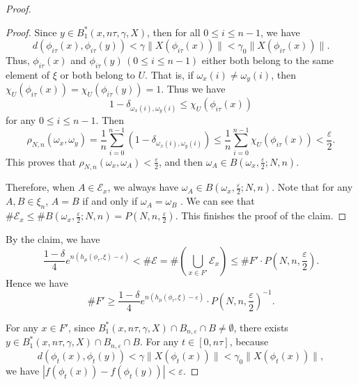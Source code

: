 \documentclass[10pt]{article}
\newtheorem*{Theorem A}{Theorem A}
\begin{document}
\begin{proof}
\begin{proof}
Since \( y \in B_1^*(x, n\tau, \gamma, X) \), then for all \( 0 \leq i \leq n - 1 \), we have
\[
d(\phi_{i\tau}(x), \phi_{i\tau}(y)) < \gamma \| X(\phi_{i\tau}(x)) \| < \gamma_0 \| X(\phi_{i\tau}(x)) \|.
\]
Thus, \( \phi_{i\tau}(x) \) and \( \phi_{i\tau}(y)\, (0\leq i\leq n-1)\) either both belong to the same element of \(\xi\) or both belong to \( U \). That is, if \( \omega_x(i) \neq \omega_y(i) \), then \( \chi_U(\phi_{i\tau}(x)) = \chi_U(\phi_{i\tau}(y)) = 1 \). Thus we have
\[
1 - \delta_{\omega_x(i), \omega_y(i)} \leq \chi_U(\phi_{i\tau}(x))
\]
for any $0\leq i\leq n-1$. Then
\[
\rho_{N,n}(\omega_x, \omega_y) = \frac{1}{n} \sum_{i = 0}^{n - 1} (1 - \delta_{\omega_x(i), \omega_y(i)}) \leq \frac{1}{n} \sum_{i = 0}^{n - 1} \chi_U(\phi_{i\tau}(x)) < \frac{\varepsilon}{2}.
\]
This proves that \( \rho_{N,n}(\omega_x, \omega_A) < \frac{\varepsilon}{2} \), and then \( \omega_A \in B\left( \omega_x, \frac{\varepsilon}{2}; N, n \right) \).

Therefore, when \(A\in \mathcal{E}_x \), we always have \( \omega_A \in B\left( \omega_x, \frac{\varepsilon}{2}; N, n \right) \). Note that for any $A, B\in \xi_n$, \( A=B \) if and only if \( \omega_A = \omega_B \) . We can see that \( \#\mathcal{E}_x \leq \# B\left( \omega_x, \frac{\varepsilon}{2}; N, n \right) = P\left( N, n, \frac{\varepsilon}{2} \right) \). This finishes the proof of the claim.
\end{proof}

By the claim, we have
\[
\frac{1 - \delta}{4} e^{n(h_\mu(\phi_\tau, \xi) - \varepsilon)} < \#\mathcal{E} = \#\left( \bigcup_{x \in F'} \mathcal{E}_x \right) \leq \# F' \cdot P\left( N, n, \frac{\varepsilon}{2} \right).
\]
Hence we have
\[
\# F' \geq \frac{1 - \delta}{4} e^{n(h_\mu(\phi_\tau, \xi) - \varepsilon)} \cdot P\left( N, n, \frac{\varepsilon}{2} \right)^{-1}.
\]

For any \( x \in F' \), since \( B_1^*(x, n\tau, \gamma, X) \cap B_{n, \varepsilon} \cap B \neq \emptyset \), there exists
\(
y \in B_1^*(x, n\tau, \gamma, X) \cap B_{n, \varepsilon} \cap B.
\)
For any $t\in[0, n\tau]$, because
\[
d(\phi_t(x), \phi_t(y)) < \gamma\| X(\phi_t(x)) \| < \gamma_0 \| X(\phi_t(x)) \|,
\]
we have \(
|f(\phi_t(x)) - f(\phi_t(y))| < \varepsilon.
\)


\end{proof}
\end{document}
